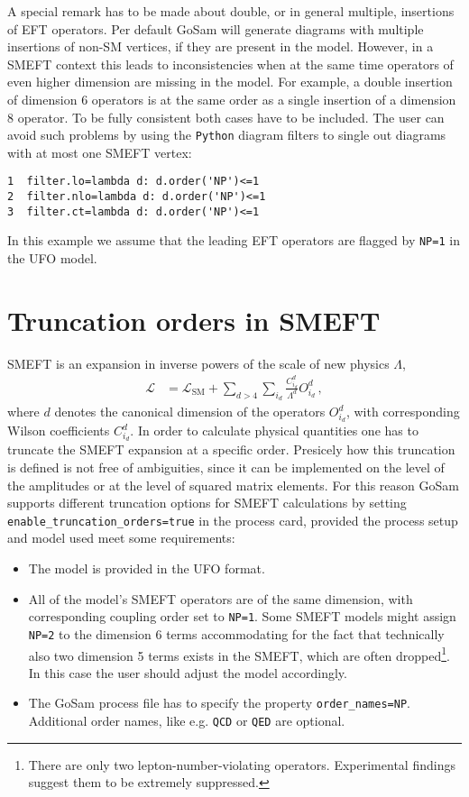 \documentclass[11pt,a4paper]{refrep}
\newcommand{\gosam}{{\sc GoSam}\xspace}
\newcommand{\python}{{\tt Python}\xspace}
\begin{document}
A special remark has to be made about double, or in general multiple, insertions of EFT operators. Per default \gosam will generate diagrams with multiple insertions of non-SM vertices, if they are present in the model. However, in a SMEFT context this leads to inconsistencies when at the same time operators of even higher dimension are missing in the model. For example, a double insertion of dimension 6 operators is at the same order as a single insertion of a dimension 8 operator. To be fully consistent both cases have to be included. The user can avoid such problems by using the \python diagram filters to single out diagrams with at most one SMEFT vertex:
\begin{lstlisting}[gobble=3,%
     basicstyle=\ttfamily]
1  filter.lo=lambda d: d.order('NP')<=1
2  filter.nlo=lambda d: d.order('NP')<=1
3  filter.ct=lambda d: d.order('NP')<=1
\end{lstlisting}
In this example we assume that the leading EFT operators are flagged by \texttt{NP=1} in the UFO model.

\section{Truncation orders in SMEFT}
SMEFT is an expansion in inverse powers of the scale of new physics $\Lambda$,
\begin{align}
   \mathcal{L} &= \mathcal{L}_\mathrm{SM} + \sum_{d>4}\sum_{i_d}\frac{C^d_{i_d}}{\Lambda^d}O^d_{i_d}\,,\label{eq:SMEFTLag}
\end{align}
where $d$ denotes the canonical dimension of the operators $O^d_{i_d}$, with corresponding Wilson coefficients $C^d_{i_d}$. In order to calculate physical quantities one has to truncate the SMEFT expansion at a specific order. Presicely how this truncation is defined is not free of ambiguities, since it can be implemented on the level of the amplitudes or at the level of squared matrix elements. For this reason \gosam supports different truncation options for SMEFT calculations by setting \texttt{enable\_truncation\_orders=true} in the process card, provided the process setup and model used meet some requirements:
\begin{itemize}
   \item The model is provided in the UFO format.
   \item All of the model's SMEFT operators are of the same dimension, with corresponding coupling order set to \texttt{NP=1}. Some SMEFT models might assign \texttt{NP=2} to the dimension 6 terms accommodating for the fact that technically also two dimension 5 terms exists in the SMEFT, which are often dropped\footnote{There are only two lepton-number-violating operators. Experimental findings suggest them to be extremely suppressed.}. In this case the user should adjust the model accordingly.
   \item The \gosam process file has to specify the property \texttt{order\_names=NP}. Additional order names, like e.g. \texttt{QCD} or \texttt{QED} are optional.
\end{itemize}
\end{document}
